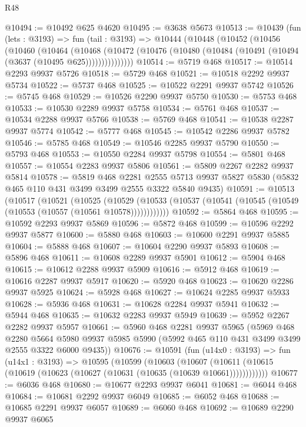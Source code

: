 \begin{lexlean}{R48}
\begin{coremodule}
@10494 := @10492 @625 @4620
@10495 := @3638 @5673
@10513 := @10439
    (fun (lets : @3193) =>
    fun (tail : @3193) =>
    @10444
      (@10448
        (@10452
          (@10456
            (@10460
              (@10464
                (@10468
                  (@10472 (@10476 (@10480 (@10484 (@10491 (@10494 (@3637 (@10495 @625)))))))))))))))
@10514 := @5719 @468
@10517 := @10514 @2293 @9937 @5726
@10518 := @5729 @468
@10521 := @10518 @2292 @9937 @5734
@10522 := @5737 @468
@10525 := @10522 @2291 @9937 @5742
@10526 := @5745 @468
@10529 := @10526 @2290 @9937 @5750
@10530 := @5753 @468
@10533 := @10530 @2289 @9937 @5758
@10534 := @5761 @468
@10537 := @10534 @2288 @9937 @5766
@10538 := @5769 @468
@10541 := @10538 @2287 @9937 @5774
@10542 := @5777 @468
@10545 := @10542 @2286 @9937 @5782
@10546 := @5785 @468
@10549 := @10546 @2285 @9937 @5790
@10550 := @5793 @468
@10553 := @10550 @2284 @9937 @5798
@10554 := @5801 @468
@10557 := @10554 @2283 @9937 @5806
@10561 := @5809 @2267 @2282 @9937 @5814
@10578 := @5819
    @468
    @2281
    @2555
    @5713
    @9937
    @5827
    @5830
    (@5832 @465 @110 @431 @3499 @3499 @2555 @3322 @5840 @9435)
@10591 := @10513
    (@10517
      (@10521
        (@10525
          (@10529 (@10533 (@10537 (@10541 (@10545 (@10549 (@10553 (@10557 (@10561 @10578))))))))))))
@10592 := @5864 @468
@10595 := @10592 @2293 @9937 @5869
@10596 := @5872 @468
@10599 := @10596 @2292 @9937 @5877
@10600 := @5880 @468
@10603 := @10600 @2291 @9937 @5885
@10604 := @5888 @468
@10607 := @10604 @2290 @9937 @5893
@10608 := @5896 @468
@10611 := @10608 @2289 @9937 @5901
@10612 := @5904 @468
@10615 := @10612 @2288 @9937 @5909
@10616 := @5912 @468
@10619 := @10616 @2287 @9937 @5917
@10620 := @5920 @468
@10623 := @10620 @2286 @9937 @5925
@10624 := @5928 @468
@10627 := @10624 @2285 @9937 @5933
@10628 := @5936 @468
@10631 := @10628 @2284 @9937 @5941
@10632 := @5944 @468
@10635 := @10632 @2283 @9937 @5949
@10639 := @5952 @2267 @2282 @9937 @5957
@10661 := @5960
    @468
    @2281
    @9937
    @5965
    (@5969
      @468
      @2280
      @5664
      @5980
      @9937
      @5985
      @5990
      (@5992 @465 @110 @431 @3499 @3499 @2555 @3322 @6000 @9435))
@10676 := @10591
    (fun (u14x0 : @3193) =>
    fun (u14x1 : @3193) =>
    @10595
      (@10599
        (@10603
          (@10607 (@10611 (@10615 (@10619 (@10623 (@10627 (@10631 (@10635 (@10639 @10661))))))))))))
@10677 := @6036 @468
@10680 := @10677 @2293 @9937 @6041
@10681 := @6044 @468
@10684 := @10681 @2292 @9937 @6049
@10685 := @6052 @468
@10688 := @10685 @2291 @9937 @6057
@10689 := @6060 @468
@10692 := @10689 @2290 @9937 @6065

\end{coremodule}
\end{lexlean}
